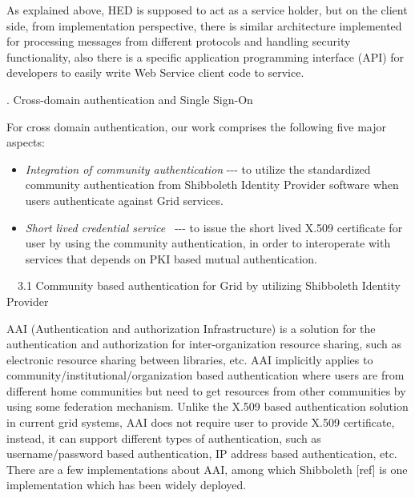 \documentclass{article}
\newcommand\liststyleLiii{%
\renewcommand\labelitemi{${\bullet}$}
\renewcommand\labelitemii{${\circ}$}
\renewcommand\labelitemiii{${\blacksquare}$}
\renewcommand\labelitemiv{${\bullet}$}
}
\begin{document}
As explained above, HED is supposed to act as a service holder, but on
the client side, from implementation perspective, there is similar
architecture implemented for processing messages from different
protocols and handling security functionality, also there is a specific
application programming interface (API) for developers to easily write
Web Service client code to service.


\bigskip

{. Cross-domain authentication and Single Sign-On
\par}

For cross domain authentication, our work comprises the following five
major aspects:

\liststyleLiii
\begin{itemize}
\item \textit{Integration of community authentication} -{}-{}- to
utilize the standardized community authentication from Shibboleth
Identity Provider software when users authenticate against Grid
services.
\item \textit{Short lived credential service} \ {}-{}-{}- to issue the
short lived X.509 certificate for user by using the community
authentication, in order to interoperate with services that depends on
PKI based mutual authentication.
\end{itemize}

\bigskip

\ \ 3.1 Community based authentication for Grid by utilizing Shibboleth
Identity Provider

AAI (Authentication and authorization Infrastructure) is a solution for
the authentication and authorization for inter-organization resource
sharing, such as electronic resource sharing between libraries, etc.
AAI implicitly applies to community/institutional/organization based
authentication where users are from different home communities but need
to get resources from other communities by using some federation
mechanism. Unlike the X.509 based authentication solution in current
grid systems, AAI does not require user to provide X.509 certificate,
instead, it can support different types of authentication, such as
username/password based authentication, IP address based
authentication, etc. There are a few implementations about AAI, among
which Shibboleth [ref] is one implementation which has been widely
deployed.
\end{document}

